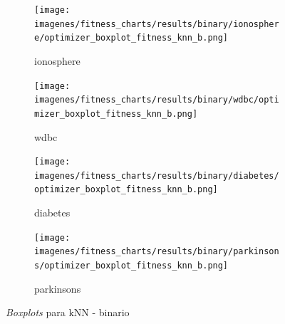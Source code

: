 \begin{figure}[htp]
    \centering
    \begin{subfigure}[htp]{0.5\textwidth}
        \texttt{[image: imagenes/fitness\_charts/results/binary/ionosphere/optimizer\_boxplot\_fitness\_knn\_b.png]}
        \caption{ionosphere}
        \label{fig:boxplot_ionosphere}
    \end{subfigure}

    \begin{subfigure}[htp]{0.5\textwidth}
        \texttt{[image: imagenes/fitness\_charts/results/binary/wdbc/optimizer\_boxplot\_fitness\_knn\_b.png]}
        \caption{wdbc}
        \label{fig:boxplot_wdbc}
    \end{subfigure}

    \begin{subfigure}[htp]{0.5\textwidth}
        \texttt{[image: imagenes/fitness\_charts/results/binary/diabetes/optimizer\_boxplot\_fitness\_knn\_b.png]}
        \caption{diabetes}
        \label{fig:boxplot_diabetes}
    \end{subfigure}

    \begin{subfigure}[htp]{0.5\textwidth}
        \texttt{[image: imagenes/fitness\_charts/results/binary/parkinsons/optimizer\_boxplot\_fitness\_knn\_b.png]}
        \caption{parkinsons}
        \label{fig:boxplot_parkinsons}
    \end{subfigure}

    \caption{\textit{Boxplots} para kNN - binario}
    \label{fig:boxplot_knn-bin}
\end{figure}

